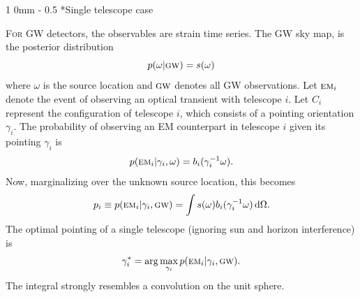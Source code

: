 \documentclass[portrait]{a0poster}
\makeatletter
\newcommand{\EM}[1]{\ensuremath{\textsc{\textrm{em}}_#1}}
\newcommand{\GW}{\ensuremath{\textsc{\textrm{gw}}}}
\renewcommand{\section}{\@startsection
{section}%
{1}%
{0mm}%
{-\baselineskip}%
{0.5\baselineskip}%
{\fontspec{Marvel Bold}\Huge}} %
\makeatother
\begin{document}
\framebreak

\section*{Single telescope case}

\lettrine{F}{\textnormal{or}} GW detectors, the observables are strain time series.  The GW sky map, is the posterior distribution
$$
	p(\omega | \GW) = s(\omega)
$$
where $\omega$ is the source location and $\GW$ denotes all GW observations.  Let $\EM{i}$ denote the event of observing an optical transient with telescope $i$.  Let $C_i$ represent the configuration of telescope $i$, which consists of a pointing orientation $\gamma_i$.  The probability of observing an EM counterpart in telescope $i$ given its pointing $\gamma_i$ is
$$
	p(\EM{i} | \gamma_i, \omega) = b_i(\gamma_i^{-1} \omega).
$$
Now, marginalizing over the unknown source location, this becomes
$$
	p_i \equiv p (\EM{i} | \gamma_i, \GW) = \int s(\omega) b_i(\gamma_i^{-1} \omega) \, \mathrm{d}\Omega.
$$
The optimal pointing of a single telescope (ignoring sun and horizon interference) is
$$
	\gamma_i^* = \arg \max_{\gamma_i} p(\EM{i} | \gamma_i, \GW).
$$
The integral strongly resembles a convolution on the unit sphere.



\end{document}
